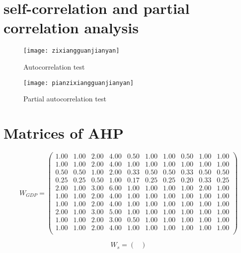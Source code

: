 \documentclass{mcmthesis}
\begin{document}
\newpage
\begin{appendices}
\section{self-correlation and partial correlation analysis}
\begin{figure}[H]%
	\begin{minipage}[t]{0.5\textwidth}
		\centering
		\texttt{[image: zixiangguanjianyan]}
		\caption{Autocorrelation test\label{fig:3}}
	\end{minipage}
	\qquad
	\begin{minipage}[t]{0.5\textwidth}
		\centering
		\texttt{[image: pianzixiangguanjianyan]}
		\caption{Partial autocorrelation test\label{fig:4}}
	\end{minipage}
\end{figure}




\section{Matrices of AHP}
\[W_{GDP}=
\begin{pmatrix}
1.00 	&	1.00 	&	2.00 	&	4.00 	&	0.50 	&	1.00 	&	1.00 	&	0.50 	&	1.00 	&	1.00 	\\
1.00 	&	1.00 	&	2.00 	&	4.00 	&	1.00 	&	1.00 	&	1.00 	&	1.00 	&	1.00 	&	1.00 	\\
0.50 	&	0.50 	&	1.00 	&	2.00 	&	0.33 	&	0.50 	&	0.50 	&	0.33 	&	0.50 	&	0.50 	\\
0.25 	&	0.25 	&	0.50 	&	1.00 	&	0.17 	&	0.25 	&	0.25 	&	0.20 	&	0.33 	&	0.25 	\\
2.00 	&	1.00 	&	3.00 	&	6.00 	&	1.00 	&	1.00 	&	1.00 	&	1.00 	&	2.00 	&	1.00 	\\
1.00 	&	1.00 	&	2.00 	&	4.00 	&	1.00 	&	1.00 	&	1.00 	&	1.00 	&	1.00 	&	1.00 	\\
1.00 	&	1.00 	&	2.00 	&	4.00 	&	1.00 	&	1.00 	&	1.00 	&	1.00 	&	1.00 	&	1.00 	\\
2.00 	&	1.00 	&	3.00 	&	5.00 	&	1.00 	&	1.00 	&	1.00 	&	1.00 	&	1.00 	&	1.00 	\\
1.00 	&	1.00 	&	2.00 	&	3.00 	&	0.50 	&	1.00 	&	1.00 	&	1.00 	&	1.00 	&	1.00 	\\
1.00 	&	1.00 	&	2.00 	&	4.00 	&	1.00 	&	1.00 	&	1.00 	&	1.00 	&	1.00 	&	1.00 	\\
\end{pmatrix}
\]

\[W_{s}=
\begin{pmatrix}


\end{pmatrix}\]
\end{appendices}
\end{document}
